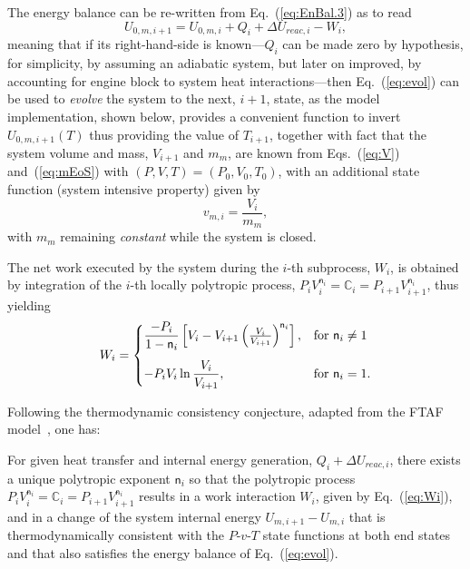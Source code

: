     The energy balance can be re-written from Eq.~(\ref{eq:EnBal.3}) as to read%
    \begin{equation}
        U_{0,m,i+1} = U_{0,m,i} + Q_i + \Delta{U_{reac,i}} - W_i,
        \label{eq:evol}
    \end{equation}
    \noindent meaning that if its right-hand-side is known---$Q_i$ can be made zero by hypothesis, for simplicity, by assuming an adiabatic system, but later on  improved,  by  accounting  for
    engine block to system heat interactions---then Eq.~(\ref{eq:evol}) can be used to \emph{evolve} the system to the next, $i+1$, state, as the model implementation, shown below, provides  a
    convenient function to invert $U_{0,m,i+1}(T)$ thus providing the value of $T_{i+1}$,  together  with  fact  that  the  system  volume  and  mass,  $V_{i+1}$  and  $m_m$,  are  known  from
    Eqs.~(\ref{eq:V}) and~(\ref{eq:mEoS}) with $(P, V, T) = (P_0, V_0, T_0)$, with an additional state function (system intensive property) given by%
    \begin{equation}
        \label{eq:v}
        v_{m,i} = \frac{V_i}{m_m},
    \end{equation}
    \noindent with $m_m$ remaining \emph{constant} while the system is closed.

    The net work executed by the system during the $i$-th subprocess, $W_i$, is obtained by integration of the $i$-th  locally  polytropic  process,  $P_iV_i^{\mathsf{n}_i}  =  \mathbb{C}_i  =
    P_{i+1}V_{i+1}^{\mathsf{n}_i}$, thus yielding%
    \begin{equation}
        W_i =
        \begin{cases}
            \dfrac{-P_i}{1-\mathsf{n}_i}\left[V_i - V_{i+1}\left(\frac{V_i}{V_{i+1}}\right)^{\mathsf{n}_i}\right],  & \text{for } \mathsf{n}_i \neq 1 \\[\bigskipamount]
            -P_iV_i\ln\dfrac{V_i}{V_{i+1}},                                                                         & \text{for } \mathsf{n}_i = 1.
        \end{cases}
        \label{eq:Wi}
    \end{equation}

    Following the thermodynamic consistency conjecture, adapted from the FTAF model~\cite{2017-NaaktgeborenC-IntJMechEngEduc}, one has:
    \begin{cnj}
        For given heat transfer and internal energy generation, $Q_i +  \Delta{U_{reac,i}}$,  there  exists  a  unique  polytropic  exponent  $\mathsf{n}_i$  so  that  the  polytropic  process
        $P_iV_i^{\mathsf{n}_i} = \mathbb{C}_i = P_{i+1}V_{i+1}^{\mathsf{n}_i}$ results in a work interaction $W_i$, given by Eq.~(\ref{eq:Wi}), and in a change of the  system  internal  energy
        $U_{m,i+1} - U_{m,i}$ that is thermodynamically consistent with the $P$-$v$-$T$ state functions at both end states and that also satisfies the energy balance of Eq.~(\ref{eq:evol}).
        \label{cnj:consistency}
    \end{cnj}

